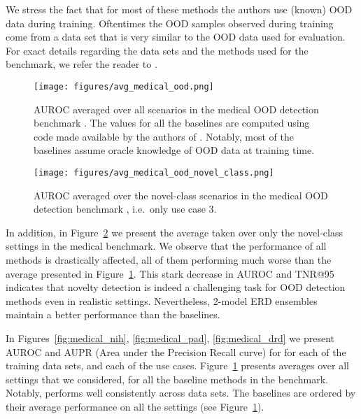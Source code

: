 We stress the fact that for most of these methods the authors use (known) OOD
data during training. Oftentimes the OOD samples observed during training come
from a data set that is very similar to the OOD data used for evaluation.  For
exact details regarding the data sets and the methods used for the benchmark, we
refer the reader to \citet{Cao2020}. 


\begin{figure}[H]
  \begin{center}
    \texttt{[image: figures/avg\_medical\_ood.png]}
  \end{center}

\caption{AUROC averaged over all scenarios in the medical OOD detection
    benchmark \citep{Cao2020}. The values for all the baselines are computed
    using code made available by the authors of \citet{Cao2020}. Notably,
    most of the baselines assume oracle knowledge of OOD data at training time.}

  \label{fig:avg_medical_ood}
\end{figure}


\begin{figure}[H]
  \begin{center}
    \texttt{[image: figures/avg\_medical\_ood\_novel\_class.png]}
  \end{center}

\caption{AUROC averaged over the novel-class scenarios in the medical OOD
  detection benchmark \citep{Cao2020}, i.e.\ only use case 3.}

  \label{fig:avg_medical_novel_class}
\end{figure}


In addition, in Figure~\ref{fig:avg_medical_novel_class} we present the average
taken over only the novel-class settings in the medical benchmark. We observe
that the performance of all methods is drastically affected, all of them
performing much worse than the average presented in
Figure~\ref{fig:avg_medical_ood}. This stark decrease in AUROC and TNR@95
indicates that novelty detection is indeed a challenging task for OOD detection
methods even in realistic settings. Nevertheless, 2-model ERD ensembles maintain
a better performance than the baselines.

In Figures~\ref{fig:medical_nih}, \ref{fig:medical_pad}, \ref{fig:medical_drd}
we present AUROC and AUPR (Area under the Precision Recall curve) for 
for each of the training data sets, and each of the use cases.
Figure~\ref{fig:avg_medical_ood} presents averages over all settings that we
considered, for all the baseline methods in the benchmark.  Notably, 
performs well consistently across data sets. The baselines are ordered by their
average performance on all the settings (see Figure~\ref{fig:avg_medical_ood}).

